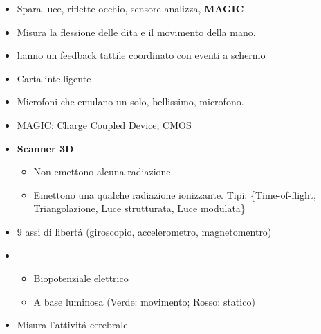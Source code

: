 \begin{itemize}
\begin{itemize}
        \item {} tavoletta grafica
    \end{itemize}
    \begin{itemize}
        \item {} La posizione assoluta del dispositivo \'e tradotta in posizione del puntatore (touch)
        \item {} Il movimento viene tradotto in movimento del puntatore (mouse)
    \end{itemize}
    \begin{itemize}
        \item {} Mobile, misura la posizione, mouse
        \item {} Fisso, misura la forza applicata, nipple
        \item {} Fisso, incrementa la sua resistenza in base alla posizione, joystick
    \end{itemize}
    \begin{itemize}
        \item {} mouse
        \item {} nipple, analog stick
    \end{itemize}
    \item {} Spara luce, riflette occhio, sensore analizza, {\textbf{\color{red}MAGIC}}
    \item {} Misura la flessione delle dita e il movimento della mano.
    \item {} hanno un feedback tattile coordinato con eventi a schermo
    \item {} Carta intelligente
    \item {} Microfoni che emulano un solo, bellissimo, microfono.
    \item {} MAGIC: Charge Coupled Device, CMOS
    \item \textbf{Scanner 3D}
    \begin{itemize}
        \item {} Non emettono alcuna radiazione.
        \item {} Emettono una qualche radiazione ionizzante. Tipi: \{Time-of-flight, Triangolazione, Luce strutturata, Luce modulata\}
    \end{itemize}
    \item {} 9 assi di libert\'a (giroscopio, accelerometro, magnetomentro)
    \item {}
    \begin{itemize}
        \item {} Biopotenziale elettrico
        \item {} A base luminosa (Verde: movimento; Rosso: statico)
    \end{itemize}
    \item {} Misura l'attivit\'a cerebrale 
\end{itemize}